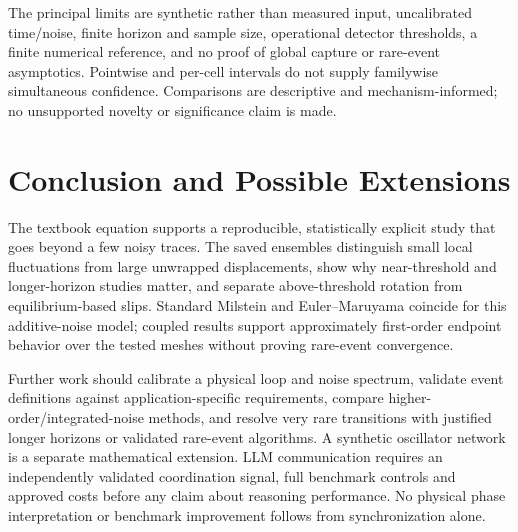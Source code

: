 \documentclass[11pt,a4paper]{article}
\begin{document}
The principal limits are synthetic rather than measured input, uncalibrated time/noise, finite horizon and sample size, operational detector thresholds, a finite numerical reference, and no proof of global capture or rare-event asymptotics. Pointwise and per-cell intervals do not supply familywise simultaneous confidence. Comparisons are descriptive and mechanism-informed; no unsupported novelty or significance claim is made.

\section{Conclusion and Possible Extensions}
The textbook equation supports a reproducible, statistically explicit study that goes beyond a few noisy traces. The saved ensembles distinguish small local fluctuations from large unwrapped displacements, show why near-threshold and longer-horizon studies matter, and separate above-threshold rotation from equilibrium-based slips. Standard Milstein and Euler--Maruyama coincide for this additive-noise model; coupled results support approximately first-order endpoint behavior over the tested meshes without proving rare-event convergence.

Further work should calibrate a physical loop and noise spectrum, validate event definitions against application-specific requirements, compare higher-order/integrated-noise methods, and resolve very rare transitions with justified longer horizons or validated rare-event algorithms. A synthetic oscillator network is a separate mathematical extension. LLM communication requires an independently validated coordination signal, full benchmark controls and approved costs before any claim about reasoning performance. No physical phase interpretation or benchmark improvement follows from synchronization alone.
\end{document}
